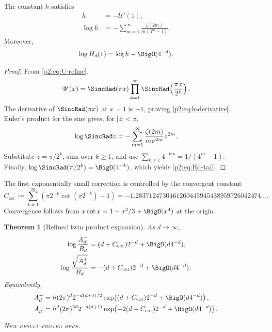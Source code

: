 \documentclass[11pt,oneside]{article}
\newtheorem{theorem}{Theorem}[section]
\theoremstyle{definition}
\theoremstyle{remark}
\newcommand{\newresult}{\textcolor{newgreen}{\textsc{New result proved here.}}}
\begin{document}
\begin{lemma}\label{p2:lem:h-forms}
The constant $h$ satisfies
\begin{align}
 h&=-\mathscr U'(1),
 \label{p2:eq:h-derivative}\\
 \log h&=-\sum_{m=1}^{\infty}
 \frac{\zeta(2m)}{m(4^m-1)}.
 \label{p2:eq:h-zeta-series}
\end{align}
Moreover,
\begin{equation}
 \log H_d(1)=\log h+\BigO(4^{-d}).
 \label{p2:eq:Hd-tail}
\end{equation}
\end{lemma}

\begin{proof}
From \eqref{p2:eq:U-refine},
\[
 \mathscr U(x)=\SincRad(\pi x)
 \prod_{k=1}^{\infty}\SincRad\!\left(\frac{\pi x}{2^k}\right).
\]
The derivative of $\SincRad(\pi x)$ at $x=1$ is $-1$, proving
\eqref{p2:eq:h-derivative}. Euler's product for the sine gives, for $|z|<\pi$,
\[
 \log\SincRad z=-\sum_{m=1}^{\infty}\frac{\zeta(2m)}{m\pi^{2m}}z^{2m}.
\]
Substitute $z=\pi/2^k$, sum over $k\ge1$, and use
$\sum_{k\ge1}4^{-km}=1/(4^m-1)$. Finally,
$\log\SincRad(\pi/2^k)=\BigO(4^{-k})$, which yields \eqref{p2:eq:Hd-tail}.
\end{proof}

The first exponentially small correction is controlled by the convergent constant
\begin{equation}
 C_{\cot}:=\sum_{k=1}^{\infty}
 \left(\pi2^{-k}\cot(\pi2^{-k})-1\right)
 =-1.2837124730461260445945438959726042474\ldots.
 \label{p2:eq:Ccot}
\end{equation}
Convergence follows from $x\cot x=1-x^2/3+\BigO(x^4)$ at the origin.

\begin{theorem}[Refined twin product expansion]\label{p2:thm:pm-product-asymptotic}
As $d\to\infty$,
\begin{align}
 \log\frac{A_d^-}{B_d}
 &=(d+C_{\cot})2^{-d}+\BigO(d4^{-d}),
 \label{p2:eq:Aminus-refined}\\
 \log\frac{\sqrt{A_d^+}}{B_d}
 &=-(d+C_{\cot})2^{-d}+\BigO(d4^{-d}).
 \label{p2:eq:Aplus-refined}
\end{align}
Equivalently,
\begin{align}
 A_d^-&=h(2\pi)^d2^{-d(d+1)/2}
 \exp\!\left((d+C_{\cot})2^{-d}+\BigO(d4^{-d})\right),
 \label{p2:eq:Aminus-full}\\
 A_d^+&=h^2(2\pi)^{2d}2^{-d(d+1)}
 \exp\!\left(-2(d+C_{\cot})2^{-d}+\BigO(d4^{-d})\right).
 \label{p2:eq:Aplus-full}
\end{align}

\smallskip\noindent\newresult
\end{theorem}
\end{document}
